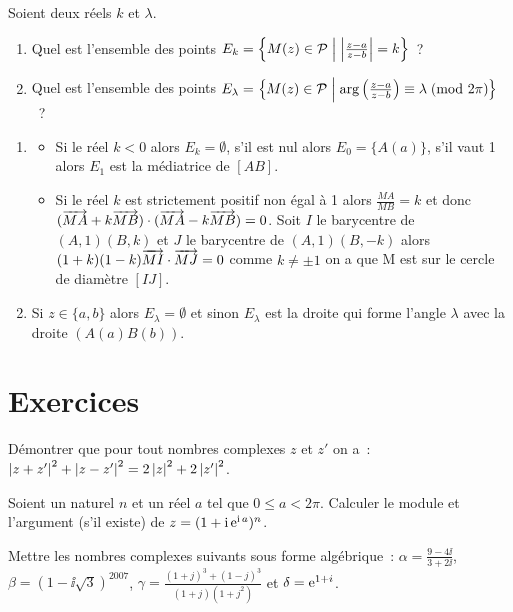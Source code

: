Soient deux réels \(k\) et \(\lambda\).
\begin{enumerate}
  \item Quel est l'ensemble des points \(E_k = \left\{M(z) \in{}
    \mathcal{P}\mathrel{}\middle|\mathrel{}\left\lvert\frac{z-a}{z-b}\right\rvert = k\right\}\)~?
  \item Quel est l'ensemble des points \(E_\lambda = \left\{M(z) \in{}
    \mathcal{P}\mathrel{}\middle|\mathrel{}\arg \left(\frac{z-a}{z-b} \right) \equiv \lambda\!\pmod {2\pi}\right\}\)~?
\end{enumerate}
\begin{enumerate}
  \item 
    \begin{itemize}
      \item Si le réel \(k<0\) alors \(E_k = \emptyset\), s'il est nul 
        alors \(E_0 = \{A(a)\}\), s'il vaut 1 alors \(E_1\) est la 
        médiatrice de \([AB]\).
      \item Si le réel \(k\) est strictement positif non égal à 1 alors 
        \(\frac{MA}{MB} = k\) et donc \((\overrightarrow{MA} + k\overrightarrow{MB}) \cdot 
        (\overrightarrow{MA}-k\overrightarrow{MB}) = 0\). Soit \(I\) le barycentre de 
        \((A,1)(B,k)\) et \(J\) le barycentre de \((A,1)(B,-k)\) alors 
        \((1 + k)(1-k) \overrightarrow{MI} \cdot \overrightarrow{MJ}  = 0\) comme \(k \neq 
        \pm 1\) on a que M est sur le cercle de diamètre \([IJ]\).
    \end{itemize}
  \item Si \(z \in{}\{a,b\}\) alors \(E_\lambda = \emptyset\) et sinon 
    \(E_\lambda\) est la droite qui forme l'angle \(\lambda\) avec la droite 
    \((A(a)B(b))\).
\end{enumerate}

\section{Exercices}

\begin{exercice}
  Démontrer que pour tout nombres complexes \(z\) et \(z'\) on a~:\(\left\lvert z + 
  z'\right\rvert^2 + \left\lvert z-z'\right\rvert^2 = 2\left\lvert z\right\rvert^2 + 2\left\lvert z'\right\rvert^2\).
\end{exercice}

\begin{exercice}
  Soient un naturel \(n\) et un réel \(a\) tel que \(0 \leqslant a < 2\pi\).  
  Calculer le module et l'argument (s'il existe) de \(z = (1 + \operatorname{i}\operatorname{e}^{\operatorname{i}{}
  a})^n\).
\end{exercice}

\begin{exercice}
  Mettre les nombres complexes suivants sous forme algébrique~: \(\alpha = 
  \frac{9-4\ii}{3 + 2\ii}\), \(\beta = (1-\ii\sqrt{3})^{2007}\), \(\gamma = 
  \frac{(1 + j)^3 + (1-j)^3}{(1 + j)(1 + j^2)}\) et \( \delta = \operatorname{e}^{1 + i}\).
\end{exercice}

